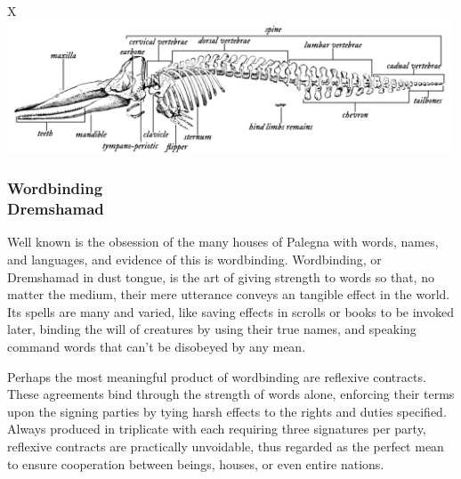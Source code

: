 
\begin{table}[b]%
    \begin{DndTable}[width=\linewidth]{X}
        \centering
        \includegraphics[width=0.99\textwidth]{01yuadrem/img/23sperm_whale_skeleton.png}
    \end{DndTable}
\end{table}

\subsubsection{Wordbinding\\ \small{Dremshamad}} %
Well known is the obsession of the many houses of Palegna with words, names, and languages, and evidence of this is wordbinding.
Wordbinding, or Dremshamad in dust tongue, is the art of giving strength to words so that, no matter the medium, their mere utterance conveys an tangible effect in the world.
Its spells are many and varied, like saving effects in scrolls or books to be invoked later, binding the will of creatures by using their true names, and speaking command words that can't be disobeyed by any mean.

Perhaps the most meaningful product of wordbinding are reflexive contracts.
These agreements bind through the strength of words alone, enforcing their terms upon the signing parties by tying harsh effects to the rights and duties specified.
Always produced in triplicate with each requiring three signatures per party, reflexive contracts are practically unvoidable, thus regarded as the perfect mean to ensure cooperation between beings, houses, or even entire nations.


